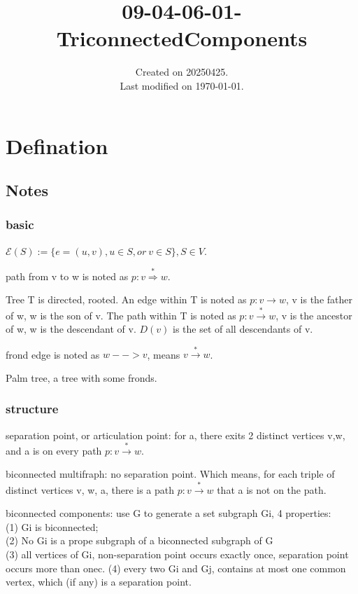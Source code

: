 \documentclass[UTF8]{../../09-Mathematics}
\begin{document}
\title{09-04-06-01-TriconnectedComponents}
\date{Created on 20250425.\\   Last modified on \today.}
\maketitle
\tableofcontents


\chapter{Defination}
 
 

\section{Notes}

\subsection{basic}


$\mathscr{E} (S) := \{ e =(u,v), u\in S, or\ v \in S\}, S \in V$.

path from v to w is noted as $p:v \stackrel{*}{\Rightarrow} w $.
 
Tree T is directed, rooted. 
An edge within T is noted as $p:v \rightarrow w $, v is the father of w, w is the son of v.
The path within T is noted as $p:v \stackrel{*}{\rightarrow} w $, v is the ancestor of w, w is the descendant of v. $D(v)$ is the set of all descendants of v.

frond edge is noted as $w --> v$, means $v \stackrel{*}{\rightarrow} w $.

Palm tree, a tree with some fronds.


\subsection{structure}

separation point, or articulation point: for a, there exits 2 distinct vertices v,w, and a is on every path  $p:v \stackrel{*}{\rightarrow} w $.

biconnected multifraph: no separation point. Which means, for each triple of distinct vertices v, w, a, there is a path $p:v \stackrel{*}{\rightarrow} w $ that a is not on the path.

biconnected components: use G to generate a set subgraph Gi, 4 properties: \\
(1) Gi is biconnected;\\
(2) No Gi is a prope subgraph of a biconnected subgraph of G   \\ %
(3) all vertices of {Gi}, non-separation point occurs exactly once, separation point occurs more than onec.
(4) every two Gi and Gj, contains at most one common vertex, which (if any) is a separation point.
\end{document}
